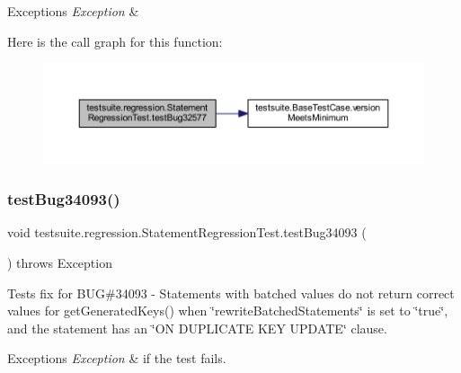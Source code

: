 \begin{DoxyExceptions}{Exceptions}
{\em Exception} & \\
\hline
\end{DoxyExceptions}
Here is the call graph for this function\+:
\nopagebreak
\begin{figure}[H]
\begin{center}
\leavevmode
\includegraphics[width=350pt]{classtestsuite_1_1regression_1_1_statement_regression_test_a46c9677cc1878bfd4f5da911d30cac02_cgraph}
\end{center}
\end{figure}
\mbox{\label{classtestsuite_1_1regression_1_1_statement_regression_test_accd5c83c1b95ec64b7d7868f9ea2be99}} 
\subsubsection{\texorpdfstring{test\+Bug34093()}{testBug34093()}}
{\footnotesize\ttfamily void testsuite.\+regression.\+Statement\+Regression\+Test.\+test\+Bug34093 (\begin{DoxyParamCaption}{ }\end{DoxyParamCaption}) throws Exception}

Tests fix for B\+UG\#34093 -\/ Statements with batched values do not return correct values for get\+Generated\+Keys() when \char`\"{}rewrite\+Batched\+Statements\char`\"{} is set to \char`\"{}true\char`\"{}, and the statement has an \char`\"{}\+O\+N D\+U\+P\+L\+I\+C\+A\+T\+E K\+E\+Y U\+P\+D\+A\+T\+E\char`\"{} clause.


\begin{DoxyExceptions}{Exceptions}
{\em Exception} & if the test fails. \\
\hline
\end{DoxyExceptions}
\mbox{\label{classtestsuite_1_1regression_1_1_statement_regression_test_a18dbb1cd4de47766732bd187315d645c}} 
